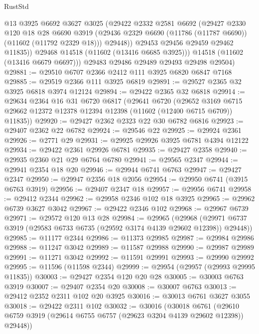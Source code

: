 \begin{lexlean}{RustStd}
\begin{coremodule}
              @13
              @3925
              @6692
              @3627
              @3025
              (@29422
                @2332
                @2581
                @6692
                (@29427
                  @2330
                  @120
                  @18
                  @28
                  @6690
                  @3919
                  (@29436 @2329 @6690 (@11786 (@11787 @6690)) (@11602 (@11792 @2329 @18)))
                  @29448))
              @29453
              @29456
              @29459
              @29462
              @11835))
          @29468
          @14518
          (@11602 (@13416 @6685 @3925)))
        @14518
        (@11602 (@13416 @6679 @6697)))
      @29483
      @29486
      @29489
      @29493
      @29498
      @29504)
@29881 := @29510 @6707 @2366 @2412 @111 @3925 @6820 @6847 @7168
@29885 := @29519 @2366 @111 @3925 @6819
@29891 := @29527 @2365 @32 @3925 @6818 @3974 @12124
@29894 := @29422 @2365 @32 @6818
@29914 := @29634
    @2364
    @16
    @31
    @6720
    @6817
    (@29641
      @6720
      (@29652 @3169 @6715 @29662 @12372 @12378 @12394 @12398 (@11602 (@12400 @6715 @6709)) @11835))
@29920 := @29427 @2362 @2323 @22 @30 @6782 @6816
@29923 := @29407 @2362 @22 @6782
@29924 := @29546 @22
@29925 := @29924 @2361
@29926 := @2771 @29
@29931 := @29925 @29926 @3925 @6781 @4394 @12122
@29934 := @29422 @2361 @29926 @6781
@29935 := @29427 @2358
@29940 := @29935 @2360 @21 @29 @6764 @6780
@29941 := @29565 @2347
@29944 := @29941 @2354 @18 @20
@29946 := @29944 @6741 @6763
@29947 := @29427 @2347
@29950 := @29947 @2356 @18 @2056
@29954 := @29950 @6741 (@3915 @6763 @3919)
@29956 := @29407 @2347 @18
@29957 := @29956 @6741
@29958 := @29412 @2344
@29962 := @29958 @2346 @102 @18 @3925
@29965 := @29962 @6739 @3627 @3042
@29967 := @29422 @2346 @102
@29968 := @29967 @6739
@29971 := @29572 @120 @13 @28
@29984 := @29965
    (@29968 (@29971 @6737 @3919 (@29583 @6733 @6735 (@29592 @3174 @4139 @29602 @12398)) @29448))
@29985 := @11177 @2344
@29986 := @11373 @29985
@29987 := @29984 @29986
@29988 := @11247 @3042
@29989 := @11587 @29988
@29990 := @29987 @29989
@29991 := @11271 @3042
@29992 := @11591 @29991
@29993 := @29990 @29992
@29995 := @11596 (@11598 @2344)
@29999 := @29954 (@29957 (@29993 @29995 @11835))
@30003 := @29427 @2354 @120 @20 @28
@30005 := @30003 @6763 @3919
@30007 := @29407 @2354 @20
@30008 := @30007 @6763
@30013 := @29412 @2352 @2311 @102 @20 @3925
@30016 := @30013 @6761 @3627 @3055
@30018 := @29422 @2311 @102
@30032 := @30016
    (@30018
      @6761
      (@29610 @6759 @3919 (@29614 @6755 @6757 (@29623 @3204 @4139 @29602 @12398)) @29448))

\end{coremodule}
\end{lexlean}
